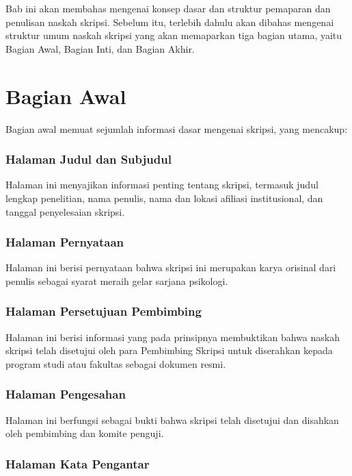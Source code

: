 \documentclass[
  indonesian,
  letterpaper,
]{scrbook}
\begin{document}
Bab ini akan membahas mengenai konsep dasar dan struktur pemaparan dan
penulisan naskah skripsi. Sebelum itu, terlebih dahulu akan dibahas
mengenai struktur umum naskah skripsi yang akan memaparkan tiga bagian
utama, yaitu Bagian Awal, Bagian Inti, dan Bagian Akhir.

\section{Bagian Awal}\label{bagian-awal}

Bagian awal memuat sejumlah informasi dasar mengenai skripsi, yang
mencakup:

\subsubsection{Halaman Judul dan
Subjudul}\label{halaman-judul-dan-subjudul}

Halaman ini menyajikan informasi penting tentang skripsi, termasuk judul
lengkap penelitian, nama penulis, nama dan lokasi afiliasi
institusional, dan tanggal penyelesaian skripsi.

\subsubsection{Halaman Pernyataan}\label{halaman-pernyataan}

Halaman ini berisi pernyataan bahwa skripsi ini merupakan karya orisinal
dari penulis sebagai syarat meraih gelar sarjana psikologi.

\subsubsection{Halaman Persetujuan
Pembimbing}\label{halaman-persetujuan-pembimbing}

Halaman ini berisi informasi yang pada prinsipnya membuktikan bahwa
naskah skripsi telah disetujui oleh para Pembimbing Skripsi untuk
diserahkan kepada program studi atau fakultas sebagai dokumen resmi.

\subsubsection{Halaman Pengesahan}\label{halaman-pengesahan}

Halaman ini berfungsi sebagai bukti bahwa skripsi telah disetujui dan
disahkan oleh pembimbing dan komite penguji.

\subsubsection{Halaman Kata Pengantar}\label{halaman-kata-pengantar}
\end{document}
